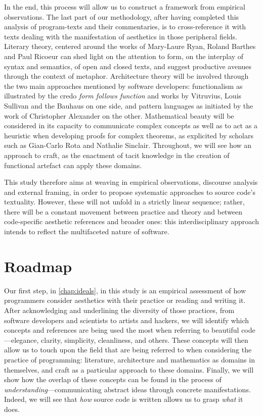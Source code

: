 In the end, this process will allow us to construct a framework from empirical observations. The last part of our methodology, after having completed this analysis of program-texts and their commentaries, is to cross-reference it with texts dealing with the manifestation of aesthetics in those peripheral fields. Literary theory, centered around the works of Mary-Laure Ryan, Roland Barthes and Paul Ricoeur can shed light on the attention to form, on the interplay of syntax and semantics, of open and closed texts, and suggest productive avenues through the context of metaphor. Architecture theory will be involved through the two main approaches mentioned by software developers: functionalism as illustrated by the credo \emph{form follows function} and works by Vitruvius, Louis Sullivan and the Bauhaus on one side, and pattern languages as initiated by the work of Christopher Alexander on the other. Mathematical beauty will be considered in its capacity to communicate complex concepts as well as to act as a heuristic when developing proofs for complex theorems, as explicited by scholars such as Gian-Carlo Rota and Nathalie Sinclair. Throughout, we will see how an approach to craft, as the enactment of tacit knowledge in the creation of functional artefact can apply these domains.

This study therefore aims at weaving in empirical observations, discourse analysis and external framing, in order to propose systematic approaches to source code's textuality. However, these will not unfold in a strictly linear sequence; rather, there will be a constant movement between practice and theory and between code-specific aesthetic references and broader ones: this interdisciplinary approach intends to reflect the multifaceted nature of software.

\section{Roadmap}
\label{sec:roadmap}

Our first step, in \ref{chap:ideals}, in this study is an empirical assessment of how programmers consider aesthetics with their practice or reading and writing it. After acknowledging and underlining the diversity of those practices, from software developers and scientists to artists and hackers, we will identify which concepts and references are being used the most when referring to beautiful code—elegance, clarity, simplicity, cleanliness, and others. These concepts will then allow us to touch upon the field that are being referred to when considering the practice of programming: literature, architecture and mathematics as domains in themselves, and craft as a particular approach to these domains. Finally, we will show how the overlap of these concepts can be found in the process of \emph{understanding}—communicating abstract ideas through concrete manifestations. Indeed, we will see that \emph{how} source code is written allows us to grasp \emph{what} it does.

